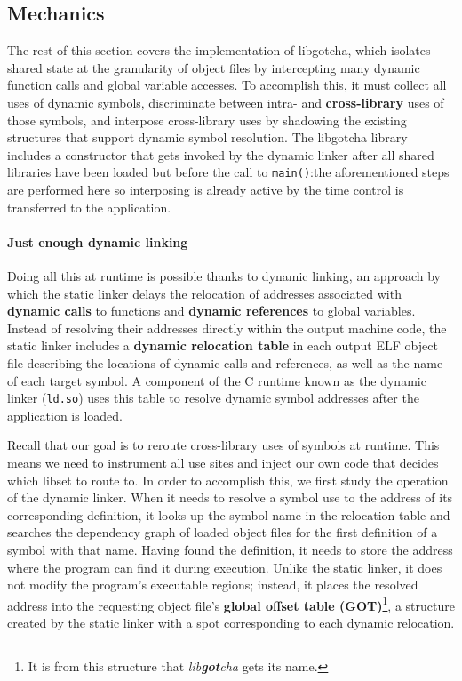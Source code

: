 \subsection{Mechanics}

The rest of this section covers the implementation of libgotcha, which isolates
shared state at the granularity of object files by intercepting many dynamic function
calls and global variable accesses.  To accomplish this, it must collect all uses of
dynamic symbols, discriminate between intra- and \textbf{cross-library} uses of those
symbols, and interpose cross-library uses by shadowing the existing structures that
support dynamic symbol resolution.  The libgotcha library includes a constructor that
gets invoked by the dynamic linker after all shared libraries have been loaded but
before the call to \texttt{main()}:\@ the aforementioned steps are performed here so
interposing is already active by the time control is transferred to the application.

\paragraph{Just enough dynamic linking}

Doing all this at runtime is possible thanks to dynamic linking, an
approach by which the static linker delays the relocation of addresses associated
with \textbf{dynamic calls} to functions and \textbf{dynamic references} to global
variables.  Instead of resolving their addresses directly within the output machine
code, the static linker includes a
\textbf{dynamic relocation table} in each output ELF object file describing the
locations of dynamic calls and references, as well as the name of each target symbol.
A component of the C runtime known as the dynamic linker (\texttt{ld.so}) uses this
table to resolve dynamic symbol addresses after the application is loaded.

Recall that our goal is to reroute cross-library uses of symbols at runtime.  This
means we need to instrument all use sites and inject our own code that decides which
libset to route to.  In order to accomplish this, we first study the operation of the
dynamic linker.  When it needs to resolve a symbol use to the address of its
corresponding definition, it looks up the symbol name in the relocation table and
searches the dependency graph of loaded object files for the first definition of a
symbol with that name.  Having found the definition, it needs to store the address
where the program can find it during execution.  Unlike the static linker, it does
not modify the program's executable regions; instead, it places the resolved address
into the requesting object file's \textbf{global offset table (GOT)}\footnote{It is
from this structure that \textit{lib\textbf{got}cha} gets its name.}, a structure
created by the static linker with a spot corresponding to each dynamic relocation.

